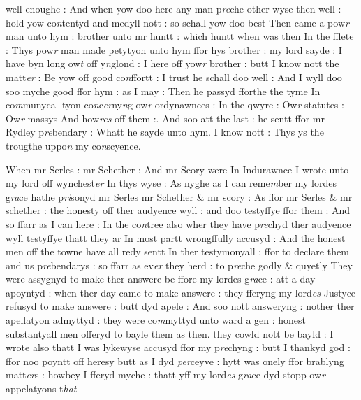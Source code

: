 \documentclass[12pt, a4paper]{book}
\begin{document}
		\ifthenelse{\isodd{\thepage}}
		{\reversemarginpar}
		{\normalmarginpar}
		well enoughe : And when yow doo here any man p\textit{re}che other wyse then  well : hold yow co\textit{n}tentyd and medyll nott : so schall yow doo best Then came a pow\textit{r} man unto hym : brother unto mr huntt : which huntt when was 
			then In the fflete : Thys pow\textit{r} man made petytyon unto hym ffor hys brother : my lord sayde : I have byn long ow\textit{t} off y\textit{n}glond : I here off yow\textit{r} brother : butt I know nott the matt\textit{er} : Be yow off good co\textit{n}ffortt : I trust he schall doo well : And I wyll doo soo myche good ffor hym : as I may : Then he passyd fforthe the tyme In co\textit{m}munyca- tyon co\textit{n}c\textit{er}ny\textit{n}g ow\textit{r} ordynawnces : In the qwyre : Ow\textit{r} statutes : Ow\textit{r} massys And how\textit{res} off them :. And soo att the last : he sentt ffor mr Rydley p\textit{re}bendary : Whatt he sayde unto hym. I know nott : Thys ys the  trougthe uppo\textit{n} my co\textit{n}scyence.
      					
		\ifthenelse{\isodd{\thepage}}
		{\reversemarginpar}
		{\normalmarginpar}
		When mr Serles : mr Schether : And mr Scory were In Indurawnce I wrote unto my lord off wynchest\textit{er} In thys wyse : As nyghe as I can reme\textit{m}ber my lordes g\textit{ra}ce hathe p\textit{ri}sonyd mr Serles mr Schether \& mr scory : As ffor mr Serles \& mr schether : the honesty off ther audyence wyll : and doo testyffye ffor them : And so ffarr as I can here : In the co\textit{n}tree also wher they have p\textit{re}chyd ther audyence wyll testyffye thatt they ar In  most partt wrongffully accusyd : And the honest men off the towne  have all redy sentt In ther testymonyall : ffor to declare them and us p\textit{re}bendarys : so ffarr as ev\textit{er} they herd : to p\textit{re}che godly \& quyetly They were assygnyd to make ther answere be ffore my lordes g\textit{ra}ce : att a day apoyntyd : when ther day came to make answere : they fferyng my lord\textit{es} Justyce refusyd to make answere : butt dyd apele : And soo nott answeryng : nother ther apellatyon admyttyd : they were co\textit{m}myttyd unto ward a gen : honest substantyall men offeryd to bayle them as then. they cowld nott be bayld : I wrote also thatt I was lykewyse accusyd ffor my p\textit{re}chyng : butt I thankyd god : ffor noo poyntt off heresy butt as I dyd \textit{per}ceyve : hytt was onely ffor brablyng matt\textit{er}s : howbey I fferyd myche : thatt yff my lord\textit{es }g\textit{ra}ce dyd stopp ow\textit{r} appelatyons t\textit{hat}
      				
\end{document}
